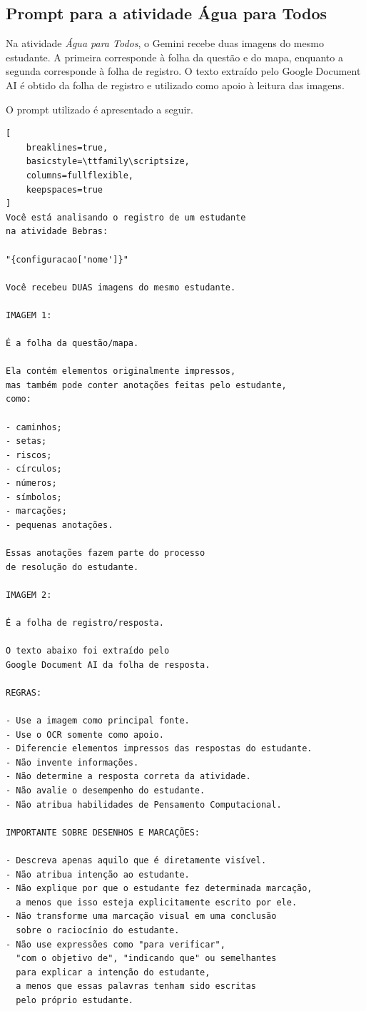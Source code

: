 \subsection*{Prompt para a atividade Água para Todos}

Na atividade \textit{Água para Todos}, o Gemini recebe duas imagens do mesmo estudante. A primeira corresponde à folha da questão e do mapa, enquanto a segunda corresponde à folha de registro. O texto extraído pelo Google Document AI é obtido da folha de registro e utilizado como apoio à leitura das imagens.

O prompt utilizado é apresentado a seguir.

\begin{lstlisting}[
    breaklines=true,
    basicstyle=\ttfamily\scriptsize,
    columns=fullflexible,
    keepspaces=true
]
Você está analisando o registro de um estudante
na atividade Bebras:

"{configuracao['nome']}"

Você recebeu DUAS imagens do mesmo estudante.

IMAGEM 1:

É a folha da questão/mapa.

Ela contém elementos originalmente impressos,
mas também pode conter anotações feitas pelo estudante,
como:

- caminhos;
- setas;
- riscos;
- círculos;
- números;
- símbolos;
- marcações;
- pequenas anotações.

Essas anotações fazem parte do processo
de resolução do estudante.

IMAGEM 2:

É a folha de registro/resposta.

O texto abaixo foi extraído pelo
Google Document AI da folha de resposta.

REGRAS:

- Use a imagem como principal fonte.
- Use o OCR somente como apoio.
- Diferencie elementos impressos das respostas do estudante.
- Não invente informações.
- Não determine a resposta correta da atividade.
- Não avalie o desempenho do estudante.
- Não atribua habilidades de Pensamento Computacional.

IMPORTANTE SOBRE DESENHOS E MARCAÇÕES:

- Descreva apenas aquilo que é diretamente visível.
- Não atribua intenção ao estudante.
- Não explique por que o estudante fez determinada marcação,
  a menos que isso esteja explicitamente escrito por ele.
- Não transforme uma marcação visual em uma conclusão
  sobre o raciocínio do estudante.
- Não use expressões como "para verificar",
  "com o objetivo de", "indicando que" ou semelhantes
  para explicar a intenção do estudante,
  a menos que essas palavras tenham sido escritas
  pelo próprio estudante.


\end{lstlisting}

